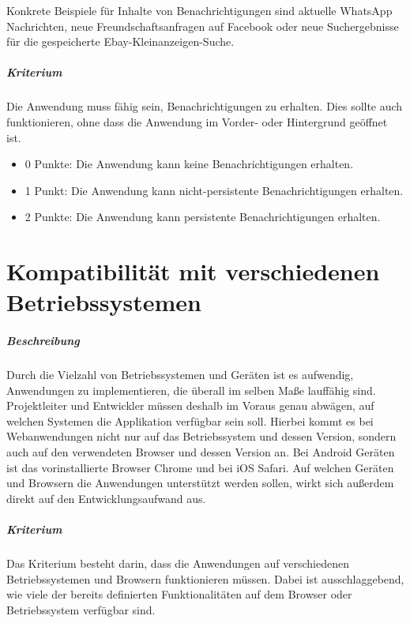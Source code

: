 Konkrete Beispiele für Inhalte von Benachrichtigungen sind aktuelle WhatsApp Nachrichten, neue Freundschaftsanfragen auf Facebook oder neue Suchergebnisse für die gespeicherte Ebay-Kleinanzeigen-Suche.

\subparagraph{Kriterium\\}
Die Anwendung muss fähig sein, Benachrichtigungen zu erhalten.
Dies sollte auch funktionieren, ohne dass die Anwendung im Vorder- oder Hintergrund geöffnet ist.

\begin{itemize}
\item 0 Punkte: Die Anwendung kann keine Benachrichtigungen erhalten.
\item 1 Punkt: Die Anwendung kann nicht-persistente Benachrichtigungen erhalten.
\item 2 Punkte: Die Anwendung kann persistente Benachrichtigungen erhalten.
\end{itemize}

\section{Kompatibilität mit verschiedenen Betriebssystemen}
\subparagraph{Beschreibung\\}
Durch die Vielzahl von Betriebssystemen und Geräten ist es aufwendig, Anwendungen zu implementieren, die überall im selben Maße lauffähig sind.
Projektleiter und Entwickler müssen deshalb im Voraus genau abwägen, auf welchen Systemen die Applikation verfügbar sein soll.
Hierbei kommt es bei Webanwendungen nicht nur auf das Betriebssystem und dessen Version, sondern auch auf den verwendeten Browser und dessen Version an.
Bei Android Geräten ist das vorinstallierte Browser Chrome und bei iOS Safari.
Auf welchen Geräten und Browsern die Anwendungen unterstützt werden sollen, wirkt sich außerdem direkt auf den Entwicklungsaufwand aus.

\subparagraph{Kriterium}
Das Kriterium besteht darin, dass die Anwendungen auf verschiedenen Betriebssystemen und Browsern funktionieren müssen.
Dabei ist ausschlaggebend, wie viele der bereits definierten Funktionalitäten auf dem Browser oder Betriebssystem verfügbar sind.

